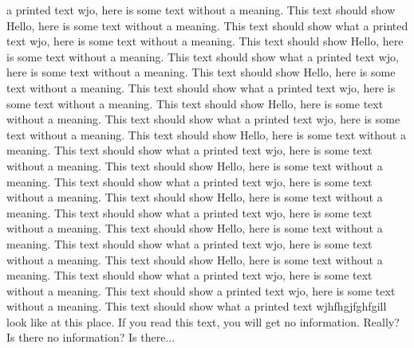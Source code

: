 \documentclass{article}
\begin{document}
\begin{multicols}{3}
a printed text wjo, here is some text without a meaning.  This text should show 
Hello, here is some text without a meaning.  This text should show what 
a printed text wjo, here is some text without a meaning.  This text should show 
Hello, here is some text without a meaning.  This text should show what 
a printed text wjo, here is some text without a meaning.  This text should show 
Hello, here is some text without a meaning.  This text should show what 
a printed text wjo, here is some text without a meaning.  This text should show 
Hello, here is some text without a meaning.  This text should show what 
a printed text wjo, here is some text without a meaning.  This text should show 
Hello, here is some text without a meaning.  This text should show what 
a printed text wjo, here is some text without a meaning.  This text should show 
Hello, here is some text without a meaning.  This text should show what 
a printed text wjo, here is some text without a meaning.  This text should show 
Hello, here is some text without a meaning.  This text should show what 
a printed text wjo, here is some text without a meaning.  This text should show 
Hello, here is some text without a meaning.  This text should show what 
a printed text wjo, here is some text without a meaning.  This text should show 
Hello, here is some text without a meaning.  This text should show what 
a printed text wjo, here is some text without a meaning.  This text should show 
a printed text wjo, here is some text without a meaning.  This text should show what 
a printed text wjhfhgjfghfgill look like at this place.
If you read this text, you will get no information.  Really?  Is there 
no information?  Is there...
\end{multicols}
 
\end{document}
